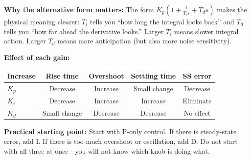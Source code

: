 \textbf{Why the alternative form matters:} The form $K_p(1 + \frac{1}{T_i s} + T_d s)$ makes the physical meaning clearer: $T_i$ tells you ``how long the integral looks back'' and $T_d$ tells you ``how far ahead the derivative looks.'' Larger $T_i$ means slower integral action. Larger $T_d$ means more anticipation (but also more noise sensitivity).

\textbf{Effect of each gain:}

\begin{center}
\begin{tabular}{lcccc}
\toprule
\textbf{Increase} & \textbf{Rise time} & \textbf{Overshoot} & \textbf{Settling time} & \textbf{SS error} \\
\midrule
$K_p$ & Decrease & Increase & Small change & Decrease \\
$K_i$ & Decrease & Increase & Increase & Eliminate \\
$K_d$ & Small change & Decrease & Decrease & No effect \\
\bottomrule
\end{tabular}
\end{center}

\textbf{Practical starting point:} Start with P-only control. If there is steady-state error, add I. If there is too much overshoot or oscillation, add D. Do not start with all three at once---you will not know which knob is doing what.

